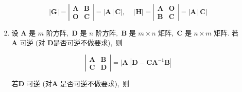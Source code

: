 \begin{enumerate}
		$$|\boldsymbol{G}|=\left|\begin{array}{ll}
			\boldsymbol{A} & \boldsymbol{B} \\
			\boldsymbol{O} & \boldsymbol{C}
		\end{array}\right|=|\boldsymbol{A}||\boldsymbol{C}|,\  \quad|\boldsymbol{H}|=\left|\begin{array}{ll}
			\boldsymbol{A} & \boldsymbol{O} \\
			\boldsymbol{B} & \boldsymbol{C}
		\end{array}\right|=|\boldsymbol{A}||\boldsymbol{C}|$$
		
		\item 设 $ \boldsymbol{A} $ 是 $ m $ 阶方阵,\  $ \boldsymbol{D} $ 是  $n $ 阶方阵,\  $ \boldsymbol{B} $ 是 $ m \times n $ 矩阵,\  $ \boldsymbol{C} $ 是 $ n \times m$  矩阵.
		若  $\boldsymbol{A} $ 可逆 (对  $\boldsymbol{D} $是否可逆不做要求),\  则
		
		$$\left|\begin{array}{ll}
			\boldsymbol{A} & \boldsymbol{B} \\
			\boldsymbol{C} & \boldsymbol{D}
		\end{array}\right|=|\boldsymbol{A}|\left|\boldsymbol{D}-\boldsymbol{C} \boldsymbol{A}^{-1} \boldsymbol{B}\right|$$
		
		若$  \boldsymbol{D} $ 可逆 (对$  \boldsymbol{A }$ 是否可逆不做要求),\  则
		

\end{enumerate}
